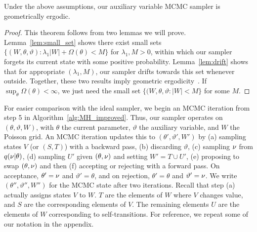 

\begin{theorem}
Under the above assumptions, our auxiliary variable MCMC sampler is
geometrically ergodic.  \label{thm:geom_erg}
\end{theorem}
\begin{proof}
\noindent This theorem follows from two lemmas we will prove.
Lemma~\ref{lem:small_set} shows there exist small sets 
$\{(W,\theta,\vartheta): \lambda_1|W| + \Omega(\theta) < M \}$ for 
$\lambda_1, M > 0$, within which our sampler forgets its current state with 
some positive probability. Lemma~\ref{lem:drift}
shows that for appropriate $(\lambda_1,M)$, our sampler drifts towards this set whenever
outside. Together, these two results imply geometric
ergodicity~\citep[Theorems 15.0.1 and Lemma 15.2.8]{meyn2009}.
If $\sup_\theta \Omega(\theta) < \infty$, we just need 
the small set $\{(W,\theta,\vartheta: |W| < M \}$ for some $M$.
\end{proof}
For easier comparison with the ideal sampler, we begin an MCMC 
iteration from step 5 in
Algorithm~\ref{alg:MH_improved}. Thus, our sampler operates on 
$(\theta,\vartheta,W)$,  with $\theta$ the current 
parameter, $\vartheta$ the auxiliary variable, and $W$ the Poisson grid. 
An MCMC iteration updates this to $(\theta',\vartheta',W')$ by 
(a) sampling states $V$ (or $(S,T)$)  with a backward pass, 
(b) discarding $\vartheta$, (c) sampling $\nu$ from $q(\nu|\theta)$, 
(d) sampling $U'$ given $(\theta,\nu)$ and setting $W' = T \cup U'$, (e) proposing to swap 
$(\theta,\nu)$ and then (f) accepting or rejecting with a forward pass. 
On acceptance, $\theta' = \nu$ and
$\vartheta' = \theta$, and on rejection, $\theta'=\theta$ and 
$\vartheta'=\nu$. We write $(\theta'',\vartheta'',W'')$ for the 
MCMC state after two iterations.
Recall that step (a) actually assigns states $V$ to $W$. $T$ are 
the elements of $W$ where $V$ changes value, and $S$ are the 
corresponding elements of $V$. The remaining elements $U$ are the elements 
of $W$ corresponding to self-transitions. For reference, we repeat some of 
our notation in the appendix.
